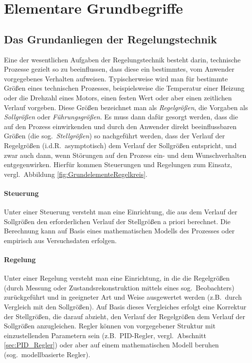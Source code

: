 \section{Elementare Grundbegriffe}\label{sec:elem-grundb}
\subsection{Das Grundanliegen der Regelungstechnik}

Eine der wesentlichen Aufgaben der Regelungstechnik besteht darin, technische Prozesse gezielt so zu beeinflussen, dass diese ein bestimmtes, vom Anwender vorgegebenes Verhalten aufweisen. Typischerweise wird man für bestimmte Größen eines technischen Prozesses, beispielsweise die Temperatur einer Heizung oder die Drehzahl eines Motors, einen festen Wert oder aber einen zeitlichen Verlauf vorgeben. Diese Größen bezeichnet man als \emph{Regelgrößen}, die Vorgaben als \emph{Sollgrößen} oder \emph{Führungsgrößen}. Es muss dann dafür gesorgt werden, dass die auf den Prozess einwirkenden und durch den Anwender direkt beeinflussbaren Größen (die sog.~\emph{Stellgrößen}) so nachgeführt werden, dass der Verlauf der Regelgrößen (i.d.R.~asymptotisch) dem Verlauf der Sollgrößen entspricht, und zwar auch dann, wenn Störungen auf den Prozess ein- und dem Wunschverhalten entgegenwirken. Hierfür kommen Steuerungen und Regelungen zum Einsatz, vergl.~Abbildung \ref{fig:GrundelementeRegelkreis}.


\paragraph{Steuerung} Unter einer Steuerung versteht man eine Einrichtung, die aus dem Verlauf der Sollgrößen den erforderlichen Verlauf der Stellgrößen a priori berechnet. Die Berechnung kann auf Basis eines mathematischen Modells des Prozesses oder empirisch aus Versuchsdaten erfolgen.
\paragraph{Regelung} Unter einer Regelung versteht man eine Einrichtung, in die die Regelgrößen (durch Messung oder Zustandsrekonstruktion mittels eines sog.~Beobachters) zurückgeführt und in geeigneter Art und Weise ausgewertet werden (z.B.~durch Vergleich mit den Sollgrößen). Auf Basis dieses Vergleiches erfolgt eine Korrektur der Stellgrößen, die darauf abzieht, den Verlauf der Regelgrößen dem Verlauf der Sollgrößen anzugleichen. Regler können von vorgegebener Struktur mit einzustellenden Parametern sein (z.B.~PID-Regler, vergl.~Abschnitt \ref{sec:PID_Regler}) oder aber auf einem mathematischen Modell beruhen (sog.~modellbasierte Regler).
